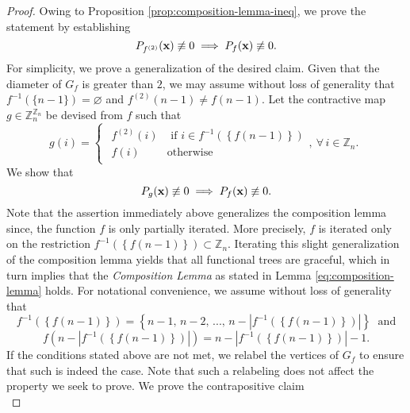 \begin{proof}
Owing to Proposition \ref{prop:composition-lemma-ineq}, we prove the statement by establishing 
\[
    P_{f^{(2)}} ({\bf x}) \not\equiv 0  \implies  P_{f} ({\bf x}) \not\equiv 0.
\]
For simplicity, we prove a generalization of the desired claim. Given
that the diameter of $G_{f}$ is greater than $2$, we may assume
without loss of generality that $f^{-1}\left(\{n-1\}\right)=\varnothing$
and $f^{(2)}(n-1)\ne f(n-1)$. Let the contractive
map $g\in\mathbb{Z}_{n}^{\mathbb{Z}_{n}}$ be devised from $f$ such
that 
\begin{equation}
g\left(i\right)=\begin{cases}
\begin{array}{cc}
f^{\left(2\right)}\left(i\right) & \text{ if }i\in f^{-1}\left(\left\{ f\left(n-1\right)\right\} \right)\\
f\left(i\right) & \text{otherwise}
\end{array},\ \forall\,i\in\mathbb{Z}_{n}.\end{cases}
\end{equation}
We show that
\begin{equation} \label{eq:composition-lemma-generalized}
P_{g} ({\bf x}) \not\equiv 0  \implies  P_{f} ({\bf x}) \not\equiv 0.
\end{equation}
Note that the assertion immediately above generalizes the composition
lemma since, the function $f$ is only partially
iterated. More precisely, $f$ is iterated only on the restriction
$f^{-1}\left(\left\{ f\left(n-1\right)\right\} \right)\subset\mathbb{Z}_{n}$.
Iterating this slight generalization of the composition lemma yields
that all functional trees are graceful, which in turn implies that the \textit{Composition Lemma} as stated in Lemma \ref{eq:composition-lemma}  holds. For notational convenience,
we assume without loss of generality that 
\[
f^{-1}\left(\left\{ f\left(n-1\right)\right\} \right)=\left\{ n-1,\,n-2,\,...,\,n-\left|f^{-1}\left(\left\{ f\left(n-1\right)\right\} \right)\right|\right\} \;\text{ and}
\]
\begin{equation}
f\left(n-\left|f^{-1}\left(\left\{ f\left(n-1\right)\right\} \right)\right|\right)=n-\left|f^{-1}\left(\left\{ f\left(n-1\right)\right\} \right)\right|-1.
\end{equation}
If the conditions stated above are not met, we relabel the vertices of $G_f$ to ensure that such is indeed the case. Note that such a relabeling does not affect the property we seek to prove. We prove the contrapositive claim
\begin{equation}\label{eq:contrapositive}

\end{equation}
\end{proof}

